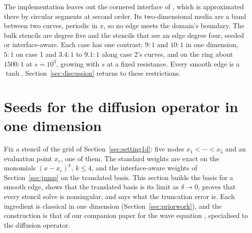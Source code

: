 \documentclass[11pt]{amsart}
\theoremstyle{definition}
\theoremstyle{remark}
\begin{document}
The implementation leaves out the cornered interface of
\cite[Sec.~5.4.5]{Martin2016}, which is approximated there by circular
segments at second order. Its two-dimensional media are a band between two
curves, periodic in $x$, so no edge meets the domain's boundary. The bulk
stencils are degree five and the stencils that see an edge degree four,
seeded or interface-aware. Each case has one contrast: $9 : 1$ and
$10 : 1$ in one dimension, $5 : 1$ on case 1 and $3.4 : 1$ to $9.1 : 1$
along case 2's curves, and on the ring about
$1500 : 1$ at $s = 10^3$, growing with $s$ at a fixed resistance. Every
smooth edge is a $\tanh$.
Section~\ref{sec:discussion} returns to these restrictions.

\section{Seeds for the diffusion operator in one dimension}
\label{sec:seeds1d}
Fix a stencil of the grid of Section~\ref{sec:setting1d}: five nodes
$x_1 < \cdots < x_5$ and an evaluation point $x_e$, one of them. The
standard weights are exact on the monomials $(x - x_e)^k$, $k \le 4$, and
the interface-aware weights of Section~\ref{sec:jump} on the translated
basis. This section builds the basis for a smooth edge, shows that the
translated basis is its limit as $\delta \to 0$, proves that every stencil
solve is nonsingular, and says what the truncation error is. Each
ingredient is classical in one dimension (Section~\ref{sec:priorwork}), and
the construction is that of our companion paper for the wave equation
\cite{Martin2026seeds}, specialised to the diffusion operator.
\end{document}
